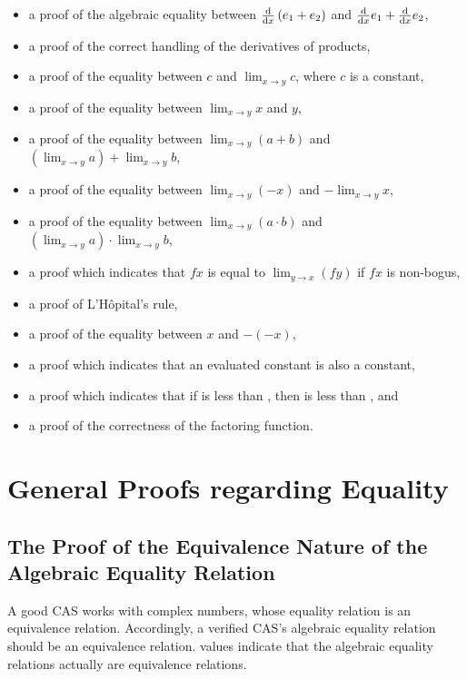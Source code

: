 \documentclass{report}
\begin{document}
\begin{itemize}
 \item a proof of the algebraic equality between \(\derivative{x} \left(e_1 + e_2\right)\) and \(\derivative{x} e_1 + \derivative{x} e_2\),
 \item a proof of the correct handling of the derivatives of products,
 \item a proof of the equality between \(c\) and \(\lim_{x \rightarrow y} c\), where \(c\) is a constant,
 \item a proof of the equality between \(\lim_{x \rightarrow y} x\) and \(y\),
 \item a proof of the equality between \(\lim_{x \rightarrow y} \left(a + b\right)\) and \(\left(\lim_{x \rightarrow y} a\right) + \lim_{x \rightarrow y} b\),
 \item a proof of the equality between \(\lim_{x \rightarrow y} \left(- x\right)\) and \(- \lim_{x \rightarrow y} x\),
 \item a proof of the equality between \(\lim_{x \rightarrow y} \left(a \cdot b\right)\) and \(\left(\lim_{x \rightarrow y} a\right) \cdot \lim_{x \rightarrow y} b\),
 \item a proof which indicates that \(f x\) is equal to \(\lim_{y \rightarrow x} \left(f y\right)\) if \(f x\) is non-bogus,
 \item a proof of L'H\^opital's rule,
 \item a proof of the equality between \(x\) and \(- \left(- x\right)\),
 \item a proof which indicates that an evaluated constant is also a constant,
 \item a proof which indicates that if  is less than , then   is less than  , and
 \item a proof of the correctness of the factoring function.
\end{itemize}

\section{General Proofs regarding Equality}

\subsection{The Proof of the Equivalence Nature of the Algebraic Equality Relation}
A good CAS works with complex numbers, whose equality relation is an equivalence relation.  Accordingly, a verified CAS's algebraic equality relation should be an equivalence relation.   values indicate that the algebraic equality relations actually are equivalence relations.
\end{document}
